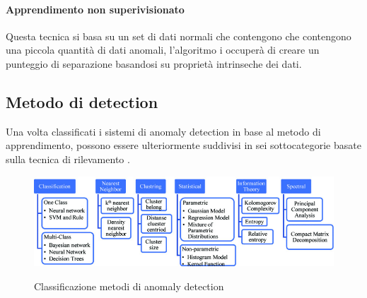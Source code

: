\paragraph{Apprendimento non superivisionato}

Questa tecnica si basa su un set di dati normali che contengono che contengono una piccola quantità di dati anomali, l'algoritmo i occuperà di creare un punteggio di separazione basandosi su proprietà intrinseche dei dati.


\subsection{Metodo di detection}

Una volta classificati i sistemi di anomaly detection in base al metodo di apprendimento, possono essere ulteriormente suddivisi in sei sottocategorie basate sulla tecnica di rilevamento \cite{anomaly_detection_techniques, anomaly_detection_classification}.


\begin{figure}[]
    \begin{center}
        
    \label{fig:anomaly_classification}
    \includegraphics[width=\hsize]{images/reti_neurali/classification.jpg}
    \caption{Classificazione metodi di anomaly detection}
    \centering
    \end{center}
\end{figure}

